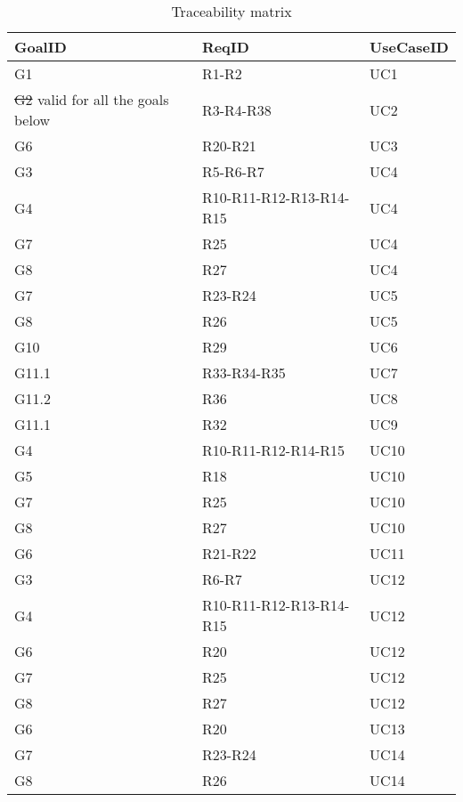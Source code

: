 \begin{table}[H]
	\begin{center}
		\begin{tabular}{ | p{} | p{} | p{} | }
		\hline
		\textbf{GoalID} & \textbf{ReqID} & \textbf{UseCaseID}\\
		\hline
		G1 & R1-R2 & UC1\\
		\hline
		\sout{G2} valid for all the goals below & R3-R4-R38 & UC2\\
		\hline
		G6 & R20-R21 & UC3\\
		\hline
		G3 & R5-R6-R7 & UC4\\
		\hline
		G4 & R10-R11-R12-R13-R14-R15 & UC4\\
		\hline
		G7 & R25 & UC4\\
		\hline
		G8 & R27 & UC4\\
		\hline
		G7 & R23-R24 & UC5\\
		\hline
		G8 & R26 & UC5\\
		\hline
		G10 & R29 & UC6\\
		\hline
		G11.1 & R33-R34-R35 & UC7\\
		\hline
		G11.2 & R36 & UC8\\
		\hline
		G11.1 & R32 & UC9\\
		\hline
		G4 & R10-R11-R12-R14-R15 & UC10\\
		\hline
		G5 & R18 & UC10\\
		\hline
		G7 & R25 & UC10\\
		\hline
		G8 & R27 & UC10\\
		\hline
		G6 & R21-R22 & UC11\\
		\hline
		G3 & R6-R7 & UC12\\
		\hline
		G4 & R10-R11-R12-R13-R14-R15 & UC12\\
		\hline
		G6 & R20 & UC12\\
		\hline
		G7 & R25 & UC12\\
		\hline
		G8 & R27 & UC12\\
		\hline
		G6 & R20 & UC13\\
		\hline
		G7 & R23-R24 & UC14\\
		\hline
		G8 & R26 & UC14\\
		\hline
		\end{tabular}
	\end{center}
	\caption{Traceability matrix}
\end{table}